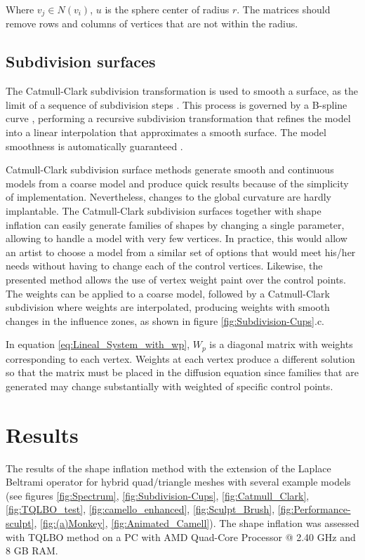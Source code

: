 \documentclass[10pt, conference]{IEEEtran}
\begin{document}
Where $v_{j}\in N\left(v_{i}\right)$, $u$ is the sphere center of
radius $r$. The matrices should remove rows and columns of vertices
that are not within the radius.


\subsection{Subdivision surfaces\label{sub:Subdivision-surfaces}}

The Catmull-Clark subdivision transformation is used to smooth a surface,
as the limit of a sequence of subdivision steps \cite{Stam1998}.
This process is governed by a B-spline curve \cite{Loop1987}, performing
a recursive subdivision transformation that refines the model into
a linear interpolation that approximates a smooth surface. The model
smoothness is automatically guaranteed \cite{DeRose1998}. 

Catmull-Clark subdivision surface methods generate smooth and continuous
models from a coarse model and produce quick results because of the
simplicity of implementation. Nevertheless, changes to the global
curvature are hardly implantable. The Catmull-Clark subdivision surfaces
together with shape inflation can easily generate families of shapes
by changing a single parameter, allowing to handle a model with very
few vertices. In practice, this would allow an artist to choose a
model from a similar set of options that would meet his/her needs
without having to change each of the control vertices. Likewise, the
presented method allows the use of vertex weight paint over the control
points. The weights can be applied to a coarse model, followed by
a Catmull-Clark subdivision where weights are interpolated, producing
weights with smooth changes in the influence zones, as shown in figure
\ref{fig:Subdivision-Cups}.c.

In equation \ref{eq:Lineal_System_with_wp}, $W_{p}$ is a diagonal
matrix with weights corresponding to each vertex. Weights at each
vertex produce a different solution so that the matrix must be placed
in the diffusion equation since families that are generated may change
substantially with weighted of specific control points.


\section{Results\label{sec:Results}}

The results of the shape inflation method with the extension of
the Laplace Beltrami operator for hybrid quad/triangle meshes with
several example models (see figures \ref{fig:Spectrum}, \ref{fig:Subdivision-Cups},
\ref{fig:Catmull_Clark}, \ref{fig:TQLBO_test}, \ref{fig:camello_enhanced},
\ref{fig:Sculpt_Brush}, \ref{fig:Performance-sculpt}, \ref{fig:(a)Monkey},
\ref{fig:Animated_Camell}). The shape inflation was assessed with
TQLBO method on a PC with AMD Quad-Core Processor @ 2.40 GHz and 8
GB RAM.
\end{document}
